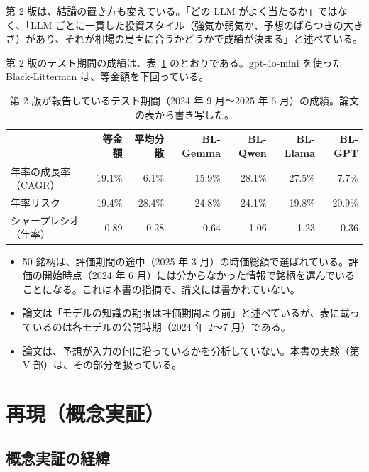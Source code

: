 \documentclass[xelatex,ja=standard,jafont=hiragino-pron,a4paper,10pt]{bxjsreport}
\newcommand{\tabref}[1]{表~\ref{#1}}
\begin{document}
第 2 版は、結論の置き方も変えている。「どの LLM がよく当たるか」ではなく、「LLM ごとに一貫した投資スタイル（強気か弱気か、予想のばらつきの大きさ）があり、それが相場の局面に合うかどうかで成績が決まる」と述べている。

第 2 版のテスト期間の成績は、\tabref{tab:v2perf} のとおりである。gpt-4o-mini を使った Black-Litterman は、等金額を下回っている。

\begin{table}[htbp]
\centering
\caption{第 2 版が報告しているテスト期間（2024 年 9 月〜2025 年 6 月）の成績。論文の表から書き写した。}
\label{tab:v2perf}
\small
\begin{tabular}{lrrrrrr}
\toprule
 & 等金額 & 平均分散 & BL-Gemma & BL-Qwen & BL-Llama & BL-GPT \\
\midrule
年率の成長率（CAGR） & 19.1\% & 6.1\% & 15.9\% & 28.1\% & 27.5\% & 7.7\% \\
年率リスク & 19.4\% & 28.4\% & 24.8\% & 24.1\% & 19.8\% & 20.9\% \\
シャープレシオ（年率） & 0.89 & 0.28 & 0.64 & 1.06 & 1.23 & 0.36 \\
\bottomrule
\end{tabular}
\end{table}

\begin{notebox}[第 2 版について注意すること]
\begin{itemize}
\item 50 銘柄は、評価期間の途中（2025 年 3 月）の時価総額で選ばれている。評価の開始時点（2024 年 6 月）には分からなかった情報で銘柄を選んでいることになる。これは本書の指摘で、論文には書かれていない。
\item 論文は「モデルの知識の期限は評価期間より前」と述べているが、表に載っているのは各モデルの公開時期（2024 年 2〜7 月）である。
\item 論文は、予想が入力の何に沿っているかを分析していない。本書の実験（第 V 部）は、その部分を扱っている。
\end{itemize}
\end{notebox}

\part{再現（概念実証）}

\chapter{概念実証の経緯}\label{ch:poc}
\end{document}
